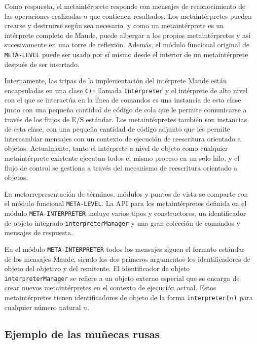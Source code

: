Como respuesta, el metaintérprete responde con mensajes de reconocimiento de las operaciones realizadas o que contienen resultados. Los metaintérpretes pueden crearse y destruirse según sea necesario, y como un metaintérprete es un intérprete completo de Maude, puede albergar a los propios metaintérpretes y así sucesivamente en una torre de reflexión. Además, el módulo funcional original de \texttt{META-LEVEL} puede ser usado por sí mismo desde el interior de un metaintérprete después de ser insertado.

Internamente, las tripas de la implementación del intérprete Maude están encapsuladas en una clase \texttt{C++} llamada \texttt{Interpreter} y el intérprete de alto nivel con el que se interactúa en la línea de comandos es una instancia de esta clase junto con una pequeña cantidad de código de cola que le permite comunicarse a través de los flujos de E/S estándar. Los metaintérpretes también son instancias de esta clase, con una pequeña cantidad de código adjunto que les permite intercambiar mensajes con un contexto de ejecución de reescritura orientado a objetos. Actualmente, tanto el intérprete a nivel de objeto como cualquier metaintérprete existente ejecutan todos el mismo proceso en un solo hilo, y el flujo de control se gestiona a través del mecanismo de reescritura orientado a objetos.

La metarrepresentación de términos, módulos y puntos de vista se comparte con el módulo funcional \texttt{META-LEVEL}. La API para los metaintérpretes definida en el módulo \texttt{META-INTERPRETER} incluye varios tipos y constructores, un identificador de objeto integrado \texttt{interpreterManager} y una gran colección de comandos y mensajes de respuesta.

En el módulo \texttt{META-INTERPRETER} todos los mensajes siguen el formato estándar de los mensajes Maude, siendo los dos primeros argumentos los identificadores de objeto del objetivo y del remitente.
El identificador de objeto \texttt{interpreterManager} se refiere a un objeto externo especial que se encarga de crear nuevos metaintérpretes en el contexto de ejecución actual. Estos metaintérpretes tienen identificadores de objeto de la forma \texttt{interpreter(}$n$\texttt{)} para cualquier número natural $n$.



\subsection{Ejemplo de las muñecas rusas}

